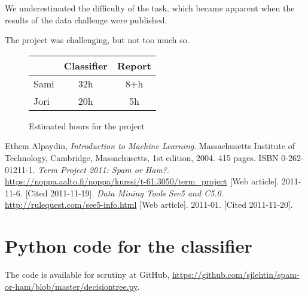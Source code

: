 \documentclass[a4paper,10pt]{article}
\begin{document}
We underestimated the difficulty of the task, which became apparent when
the results of the data challenge were published.

The project was challenging, but not too much so.

\begin{figure}
  \centering
\begin{tabular}{|l|c|c|}
\hline
 & Classifier & Report \\ \hline
Sami & 32h & 8+h \\ %
Jori & 20h & 5h  \\ %
\hline
\end{tabular}
  \caption{Estimated hours for the project}
  \label{fig:effort-estimate} 
\end{figure}

\pagebreak
\begin{thebibliography}{9}
  Ethem Alpaydin,
  \emph{Introduction to Machine Learning}.
  Massachusetts Institute of Technology, Cambridge, Massachusetts,
  1st edition,
  2004. 415 pages. ISBN 0-262-01211-1.
  \emph{Term Project 2011: Spam or Ham?}.
  \href{https://noppa.aalto.fi/noppa/kurssi/t-61.3050/term\_project}
  {https://noppa.aalto.fi/noppa/kurssi/t-61.3050/term\_project}
  [Web article]. 2011-11-6. [Cited 2011-11-19].
  \emph{Data Mining Tools See5 and C5.0}.
  \href{http://rulequest.com/see5-info.html}
  {http://rulequest.com/see5-info.html}
  [Web article]. 2011-01. [Cited 2011-11-20].

\end{thebibliography}

\appendix
\section{Python code for the classifier}

The code is available for scrutiny at GitHub,
\href{https://github.com/sjlehtin/spam-or-ham/blob/master/decisiontree.py}
{https://github.com/sjlehtin/spam-or-ham/blob/master/decisiontree.py}.
\end{document}
